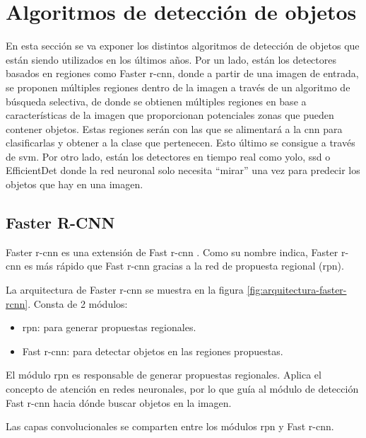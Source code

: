 \section{Algoritmos de detección de objetos}
\label{sec:tecnicas-utilizadas-detection}

En esta sección se va exponer los distintos algoritmos de detección de objetos que están siendo utilizados en los últimos años. Por un lado, están los detectores basados en regiones como Faster \gls{r-cnn}, donde a partir de una imagen de entrada, se proponen múltiples regiones dentro de la imagen a través de un algoritmo de búsqueda selectiva, de donde se obtienen múltiples regiones en base a características de la imagen que proporcionan potenciales zonas que pueden contener objetos. Estas regiones serán con las que se alimentará a la \gls{cnn} para clasificarlas y obtener a la clase que pertenecen. Esto último se consigue a través de \gls{svm}. Por otro lado, están los detectores en tiempo real como \gls{yolo}, \gls{ssd} o EfficientDet donde la red neuronal solo necesita ``mirar'' una vez para predecir los objetos que hay en una imagen.

\subsection{Faster R-CNN}
\label{subsec:faster-rcnn}

Faster \gls{r-cnn} \cite{ren2016faster} es una extensión de Fast \gls{r-cnn} \cite{7410526}. Como su nombre indica, Faster \gls{r-cnn} es más rápido que Fast \gls{r-cnn} gracias a la red de propuesta regional (\gls{rpn}).

La arquitectura de Faster \gls{r-cnn} se muestra en la figura \ref{fig:arquitectura-faster-rcnn}. Consta de 2 módulos:

\begin{itemize}
    \item \gls{rpn}: para generar propuestas regionales.
    \item Fast \gls{r-cnn}: para detectar objetos en las regiones propuestas.
\end{itemize}

El módulo \gls{rpn} es responsable de generar propuestas regionales. Aplica el concepto de atención en redes neuronales, por lo que guía al módulo de detección Fast \gls{r-cnn} hacia dónde buscar objetos en la imagen.

Las capas convolucionales se comparten entre los módulos \gls{rpn} y Fast \gls{r-cnn}.

